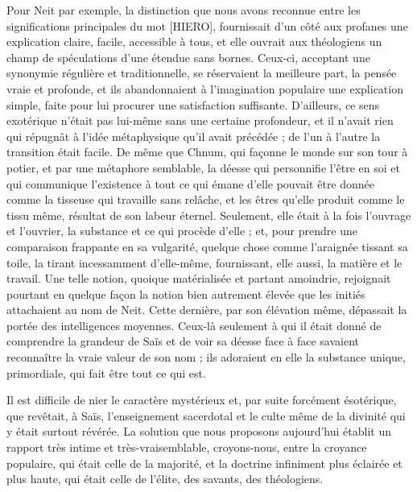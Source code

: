 \documentclass[a4paper, 11pt, oneside]{article}
\begin{document}
Pour Neit par exemple, la distinction que nous avons reconnue entre les significations principales du mot [HIERO], fournissait d'un côté aux profanes une explication claire, facile, accessible à tous, et elle ouvrait aux théologiens un champ de spéculations d'une étendue sans bornes. Ceux-ci, acceptant une synonymie régulière et traditionnelle, se réservaient la meilleure part, la pensée vraie et profonde, et ils abandonnaient à l'imagination populaire une explication simple, faite pour lui procurer une satisfaction suffisante. D'ailleurs, ce sens exotérique n'était pas lui-même sans une certaine profondeur, et il n'avait rien qui répugnât à l'idée métaphysique qu'il avait précédée ; de l'un à l'autre la transition était facile. De même que Chnum, qui façonne le monde sur son tour à potier, et par une métaphore semblable, la déesse qui personnifie l'être en soi et qui communique l'existence à tout ce qui émane d'elle pouvait être donnée comme la tisseuse qui travaille sans relâche, et les êtres qu'elle produit comme le tissu même, résultat de son labeur éternel. Seulement, elle était à la fois l'ouvrage et l'ouvrier, la substance et ce qui procède d'elle ; et, pour prendre une comparaison frappante en sa vulgarité, quelque chose comme l'araignée tissant sa toile, la tirant incessamment d'elle-même, fournissant, elle aussi, la matière et le travail. Une telle notion, quoique matérialisée et partant amoindrie, rejoignait pourtant en quelque façon la notion bien autrement élevée que les initiés attachaient au nom de Neit. Cette dernière, par son élévation même, dépassait la portée des intelligences moyennes. Ceux-là seulement à qui il était donné de comprendre la grandeur de Saïs et de voir sa déesse face à face savaient reconnaître la vraie valeur de son nom ; ils adoraient en elle la substance unique, primordiale, qui fait être tout ce qui est.

Il est difficile de nier le caractère mystérieux et, par suite forcément ésotérique, que revêtait, à Saïs, l'enseignement sacerdotal et le culte même de la divinité qui y était surtout révérée. La solution que nous proposons aujourd'hui établit un rapport très intime et très-vraisemblable, croyons-nous, entre la croyance populaire, qui était celle de la majorité, et la doctrine infiniment plus éclairée et plus haute, qui était celle de l'élite, des savants, des théologiens.
\end{document}
